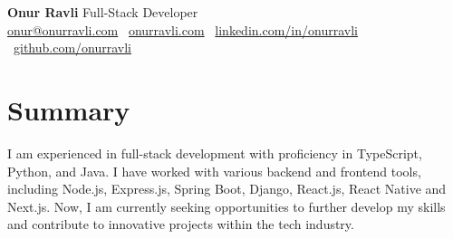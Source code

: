 \documentclass[10pt,a4paper]{extarticle}
\begin{document}
\begin{center}
    \begin{minipage}{\textwidth}
        \centering
        {\LARGE\textbf{Onur Ravli}} \hspace{2pt} {\LARGE{Full-Stack Developer}}\\[10pt]
        \href{mailto:onur@onurravli.com}{onur@onurravli.com} \textbullet\
        \href{https://onurravli.com}{onurravli.com} \textbullet\
        \href{https://linkedin.com/in/onurravli}{linkedin.com/in/onurravli} \textbullet\
        \href{https://github.com/onurravli}{github.com/onurravli}
    \end{minipage}
\end{center}
\section{Summary}
I am experienced in full-stack development with proficiency in TypeScript, Python, and Java. I have worked
with various backend and frontend tools, including Node.js, Express.js, Spring Boot, Django, React.js, React
Native and Next.js. Now, I am currently seeking opportunities to further develop my skills and contribute to
innovative projects within the tech industry.
\end{document}
